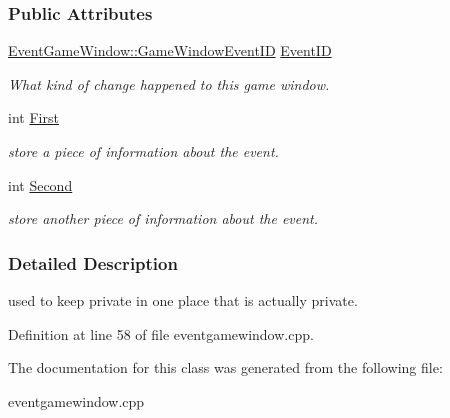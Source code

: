 \subsubsection*{Public Attributes}
\begin{DoxyCompactItemize}
\item 
\hypertarget{classMezzanine_1_1EventGameWindowData_aac0a9525d98c10f154aa2c55ddaba7c9}{
\hyperlink{classMezzanine_1_1EventGameWindow_a0f0ff29853317334f018bcf48d502af2}{EventGameWindow::GameWindowEventID} \hyperlink{classMezzanine_1_1EventGameWindowData_aac0a9525d98c10f154aa2c55ddaba7c9}{EventID}}
\label{classMezzanine_1_1EventGameWindowData_aac0a9525d98c10f154aa2c55ddaba7c9}

\begin{DoxyCompactList}\small\item\em What kind of change happened to this game window. \item\end{DoxyCompactList}\item 
\hypertarget{classMezzanine_1_1EventGameWindowData_a6427a05b03ab986af6efe93494bd1f43}{
int \hyperlink{classMezzanine_1_1EventGameWindowData_a6427a05b03ab986af6efe93494bd1f43}{First}}
\label{classMezzanine_1_1EventGameWindowData_a6427a05b03ab986af6efe93494bd1f43}

\begin{DoxyCompactList}\small\item\em store a piece of information about the event. \item\end{DoxyCompactList}\item 
\hypertarget{classMezzanine_1_1EventGameWindowData_a18bfdf1676fab3be14a8815bb91e971c}{
int \hyperlink{classMezzanine_1_1EventGameWindowData_a18bfdf1676fab3be14a8815bb91e971c}{Second}}
\label{classMezzanine_1_1EventGameWindowData_a18bfdf1676fab3be14a8815bb91e971c}

\begin{DoxyCompactList}\small\item\em store another piece of information about the event. \item\end{DoxyCompactList}\end{DoxyCompactItemize}


\subsubsection{Detailed Description}
used to keep private in one place that is actually private. 

Definition at line 58 of file eventgamewindow.cpp.



The documentation for this class was generated from the following file:\begin{DoxyCompactItemize}
\item 
eventgamewindow.cpp\end{DoxyCompactItemize}
